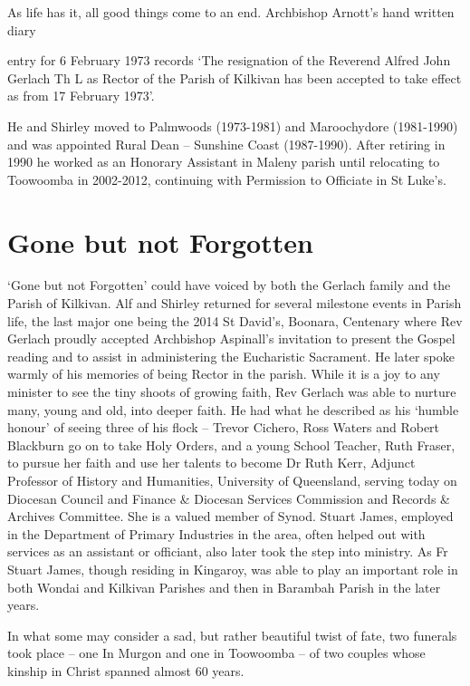 As life has it, all good things come to an end. Archbishop Arnott's hand written diary

entry for 6 February 1973 records `The resignation of the Reverend Alfred John Gerlach Th L as Rector of the Parish of Kilkivan has been accepted to take effect as from 17 February 1973'.

He and Shirley moved to Palmwoods (1973-1981) and Maroochydore (1981-1990) and was appointed Rural Dean -- Sunshine Coast (1987-1990). After retiring in 1990 he worked as an Honorary Assistant in Maleny parish until relocating to Toowoomba in 2002-2012, continuing with Permission to Officiate in St Luke's.

\hypertarget{gone-but-not-forgotten}{%
\section{Gone but not Forgotten}\label{gone-but-not-forgotten}}

`Gone but not Forgotten' could have voiced by both the Gerlach family and the Parish of Kilkivan. Alf and Shirley returned for several milestone events in Parish life, the last major one being the 2014 St David's, Boonara, Centenary where Rev Gerlach proudly accepted Archbishop Aspinall's invitation to present the Gospel reading and to assist in administering the Eucharistic Sacrament. He later spoke warmly of his memories of being Rector in the parish. While it is a joy to any minister to see the tiny shoots of growing faith, Rev Gerlach was able to nurture many, young and old, into deeper faith. He had what he described as his `humble honour' of seeing three of his flock -- Trevor Cichero, Ross Waters and Robert Blackburn go on to take Holy Orders, and a young School Teacher, Ruth Fraser, to pursue her faith and use her talents to become Dr Ruth Kerr, Adjunct Professor of History and Humanities, University of Queensland, serving today on Diocesan Council and Finance \& Diocesan Services Commission and Records \& Archives Committee. She is a valued member of Synod. Stuart James, employed in the Department of Primary Industries in the area, often helped out with services as an assistant or officiant, also later took the step into ministry. As Fr Stuart James, though residing in Kingaroy, was able to play an important role in both Wondai and Kilkivan Parishes and then in Barambah Parish in the later years.

In what some may consider a sad, but rather beautiful twist of fate, two funerals took place -- one In Murgon and one in Toowoomba -- of two couples whose kinship in Christ spanned almost 60 years.


